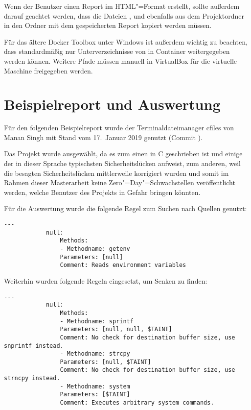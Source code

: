        Wenn der Benutzer einen Report im
        \gls{HTML}"=Format erstellt,
        sollte außerdem darauf geachtet werden,
        dass die Dateien
        ,
         und
         ebenfalls aus dem Projektordner in den Ordner mit dem gespeicherten Report kopiert werden müssen.

        Für das ältere Docker Toolbox unter Windows ist außerdem wichtig zu beachten,
        dass standardmäßig nur Unterverzeichnisse von
         in Container weitergegeben werden können.
        Weitere Pfade müssen manuell in VirtualBox für die virtuelle Maschine freigegeben werden.\cite{Procida2019}

    \section{Beispielreport und Auswertung}
        Für den folgenden Beispielreport wurde der Terminaldateimanager cfiles von Manan Singh mit Stand vom 17.~Januar 2019 genutzt
        (Commit
        ).\cite{Singh2019}

        Das Projekt wurde ausgewählt,
        da es zum einen in C geschrieben ist und
        einige der in dieser Sprache typischsten Sicherheitslücken aufweist,
        zum anderen,
        weil die besagten Sicherheitslücken mittlerweile korrigiert wurden und
        somit im Rahmen dieser Masterarbeit keine Zero"=Day"=Schwachstellen veröffentlicht werden,
        welche Benutzer des Projekts in Gefahr bringen könnten.

        Für die Auswertung wurde die folgende Regel zum Suchen nach Quellen genutzt:

        \begin{lstlisting}[caption={Regel für die Suche nach Quellen}, gobble=12]
            ---
            null:
                Methods:
                - Methodname: getenv
                Parameters: [null]
                Comment: Reads environment variables
        \end{lstlisting}

        Weiterhin wurden folgende Regeln eingesetzt,
        um Senken zu finden:

        \begin{lstlisting}[caption={Regeln für die Suche nach Senken}, gobble=12]
            ---
            null:
                Methods:
                - Methodname: sprintf
                Parameters: [null, null, $TAINT]
                Comment: No check for destination buffer size, use snprintf instead.
                - Methodname: strcpy
                Parameters: [null, $TAINT]
                Comment: No check for destination buffer size, use strncpy instead.
                - Methodname: system
                Parameters: [$TAINT]
                Comment: Executes arbitrary system commands.
        \end{lstlisting}

